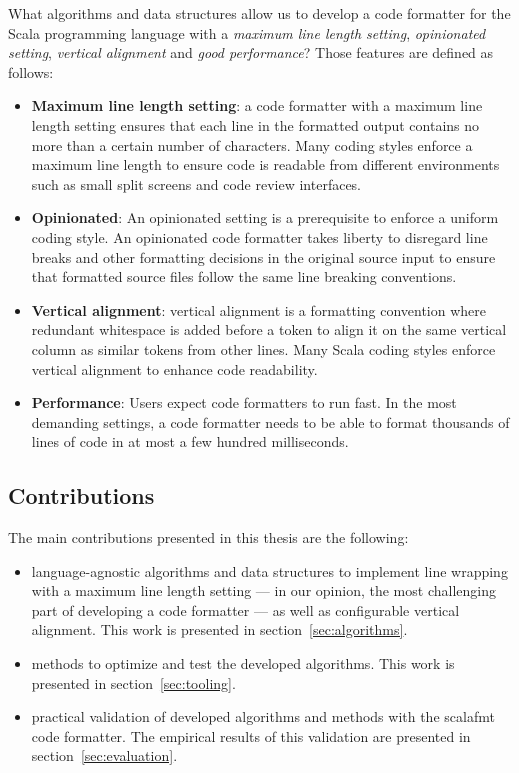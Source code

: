 What algorithms and data structures allow us to develop a code formatter for the Scala programming language with a \emph{maximum line length setting}, \emph{opinionated setting}, \emph{vertical alignment} and \emph{good performance}?
Those features are defined as follows:
\begin{itemize}
  \item \textbf{Maximum line length setting}: a code formatter with a maximum line length setting ensures that each line in the formatted output contains no more than a certain number of characters.
    Many coding styles enforce a maximum line length to ensure code is readable from different environments such as small split screens and code review interfaces.
  \item \textbf{Opinionated}:
    An opinionated setting is a prerequisite to enforce a uniform coding style.
    An opinionated code formatter takes liberty to disregard line breaks and other formatting decisions in the original source input to ensure that formatted source files follow the same line breaking conventions.
  \item \textbf{Vertical alignment}: vertical alignment is a formatting convention where redundant whitespace is added before a token to align it on the same vertical column as similar tokens from other lines. Many Scala coding styles enforce vertical alignment to enhance code readability.
  \item \textbf{Performance}: Users expect code formatters to run fast.
    In the most demanding settings, a code formatter needs to be able to format thousands of lines of code in at most a few hundred milliseconds.

\end{itemize}

\subsection{Contributions}
The main contributions presented in this thesis are the following:
\begin{itemize}
  \item language-agnostic algorithms and data structures to implement line
    wrapping with a maximum line length setting --- in our opinion, the most
    challenging part of developing a code formatter --- as well as configurable
    vertical alignment.
    This work is presented in section~\ref{sec:algorithms}.
  \item methods to optimize and test the developed algorithms.
    This work is presented in section~\ref{sec:tooling}.
  \item practical validation of developed algorithms and methods with the scalafmt code formatter.
    The empirical results of this validation are presented in section~\ref{sec:evaluation}.
\end{itemize}
